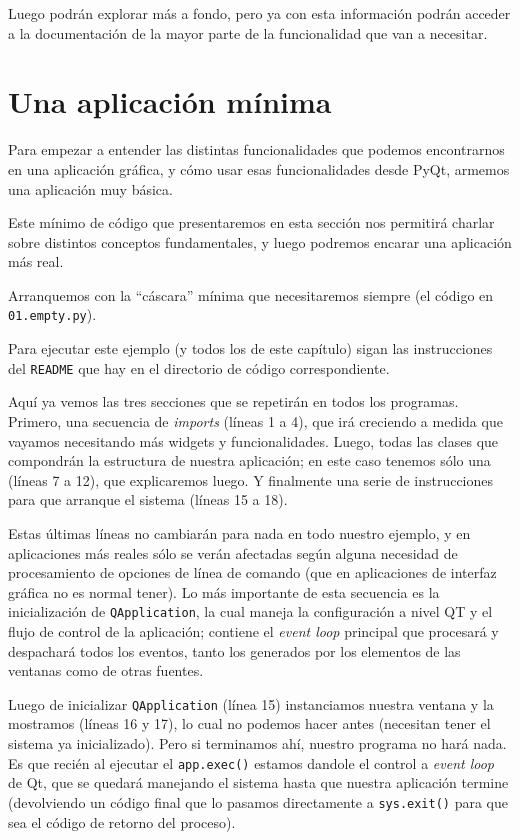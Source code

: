 Luego podrán explorar más a fondo, pero ya con esta información podrán acceder a la documentación de la mayor parte de la funcionalidad que van a necesitar.


\section{Una aplicación mínima}

Para empezar a entender las distintas funcionalidades que podemos encontrarnos en una aplicación gráfica, y cómo usar esas funcionalidades desde PyQt, armemos una aplicación muy básica.

Este mínimo de código que presentaremos en esta sección nos permitirá charlar sobre distintos conceptos fundamentales, y luego podremos encarar una aplicación más real.

Arranquemos con la ``cáscara'' mínima que necesitaremos siempre (el código en \texttt{01.empty.py}).


\begin{info}
Para ejecutar este ejemplo (y todos los de este capítulo) sigan las instrucciones del \texttt{README} que hay en el directorio de código correspondiente.
\end{info}

Aquí ya vemos las tres secciones que se repetirán en todos los programas. Primero, una secuencia de \textit{imports} (líneas 1 a 4), que irá creciendo a medida que vayamos necesitando más widgets y funcionalidades. Luego, todas las clases que compondrán la estructura de nuestra aplicación; en este caso tenemos sólo una (líneas 7 a 12), que explicaremos luego. Y finalmente una serie de instrucciones para que arranque el sistema (líneas 15 a 18).

Estas últimas líneas no cambiarán para nada en todo nuestro ejemplo, y en aplicaciones más reales sólo se verán afectadas según alguna necesidad de procesamiento de opciones de línea de comando (que en aplicaciones de interfaz gráfica no es normal tener). Lo más importante de esta secuencia es la inicialización de \texttt{QApplication}, la cual maneja la configuración a nivel QT y el flujo de control de la aplicación; contiene el \textit{event loop} principal que procesará y despachará todos los eventos, tanto los generados por los elementos de las ventanas como de otras fuentes.

Luego de inicializar \texttt{QApplication} (línea 15) instanciamos nuestra ventana y la mostramos (líneas 16 y 17), lo cual no podemos hacer antes (necesitan tener el sistema ya inicializado). Pero si terminamos ahí, nuestro programa no hará nada. Es que recién al ejecutar el \texttt{app.exec()} estamos dandole el control a \textit{event loop} de Qt, que se quedará manejando el sistema hasta que nuestra aplicación termine (devolviendo un código final que lo pasamos directamente a \texttt{sys.exit()} para que sea el código de retorno del proceso).

